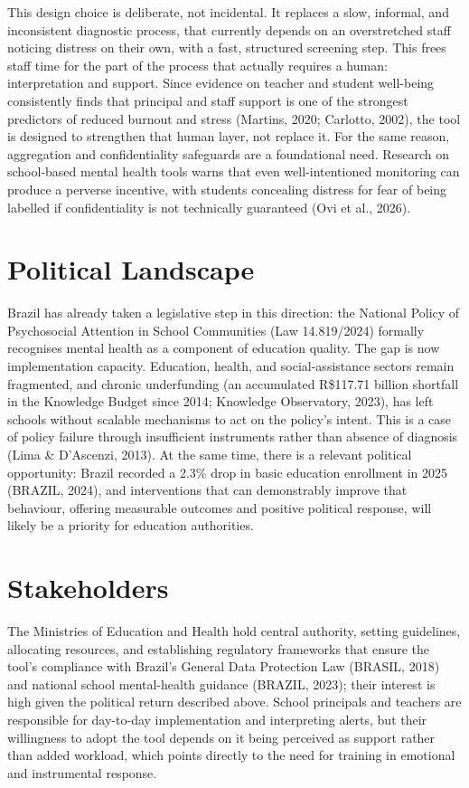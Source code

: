 \documentclass[
  12pt,
  openright,
  oneside,
  a4paper,
  english,
  brazil
]{abntex2}
\begin{document}
This design choice is deliberate, not incidental. It replaces a slow, informal,
and inconsistent diagnostic process, that currently depends on an overstretched
staff noticing distress on their own, with a fast, structured screening step.
This frees staff time for the part of the process that actually requires a
human: interpretation and support. Since evidence on teacher and student
well-being consistently finds that principal and staff support is one of the
strongest predictors of reduced burnout and stress (Martins, 2020; Carlotto,
2002), the tool is designed to strengthen that human layer, not replace it. For
the same reason, aggregation and confidentiality safeguards are a foundational
need. Research on school-based mental health tools warns that even
well-intentioned monitoring can produce a perverse incentive, with students
concealing distress for fear of being labelled if confidentiality is not
technically guaranteed (Ovi et al., 2026).

\section{Political Landscape}

Brazil has already taken a legislative step in this direction: the National
Policy of Psychosocial Attention in School Communities (Law 14.819/2024)
formally recognises mental health as a component of education quality. The gap
is now implementation capacity. Education, health, and social-assistance sectors
remain fragmented, and chronic underfunding (an accumulated R\$117.71 billion
shortfall in the Knowledge Budget since 2014; Knowledge Observatory, 2023), has
left schools without scalable mechanisms to act on the policy's intent. This is
a case of policy failure through insufficient instruments rather than absence
of diagnosis (Lima \& D'Ascenzi, 2013). At the same time, there is a relevant
political opportunity: Brazil recorded a 2.3\% drop in basic education enrollment
in 2025 (BRAZIL, 2024), and interventions that can demonstrably improve that
behaviour, offering measurable outcomes and positive political response, will
likely be a priority for education authorities.

\section{Stakeholders}

The Ministries of Education and Health hold central authority, setting
guidelines, allocating resources, and establishing regulatory frameworks that
ensure the tool's compliance with Brazil's General Data Protection Law (BRASIL,
2018) and national school mental-health guidance (BRAZIL, 2023); their interest
is high given the political return described above. School principals and
teachers are responsible for day-to-day implementation and interpreting alerts,
but their willingness to adopt the tool depends on it being perceived as
support rather than added workload, which points directly to the need for
training in emotional and instrumental response.
\end{document}
